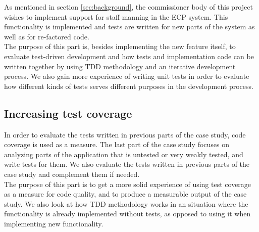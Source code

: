 As mentioned in section \ref{sec:background}, the commissioner body of
this project wishes to implement support for staff manning in the ECP
system. This functionality is implemented and tests are written for
new parts of the system as well as for re-factored code.\\

The purpose of this part is, besides implementing the new feature
itself, to evaluate test-driven development and how tests and
implementation code can be written together by using TDD methodology and
an iterative development process. We also gain more experience of
writing unit tests in order to evaluate how different kinds of tests
serves different purposes in the development process.\\


\subsection{Increasing test coverage}
\label{sec:casestudy_3}

In order to evaluate the tests written in previous parts of the case
study, code coverage is used as a measure. The last part of the case
study focuses on analyzing parts of the application that is untested or
very weakly tested, and write tests for them. We also evaluate the tests
written in previous parts of the case study and complement them if
needed.\\

The purpose of this part is to get a more solid experience of using test
coverage as a measure for code quality, and to produce a measurable
output of the case study. We also look at how TDD methodology works in
an situation where the functionality is already implemented without
tests, as opposed to using it when implementing new functionality.\\
